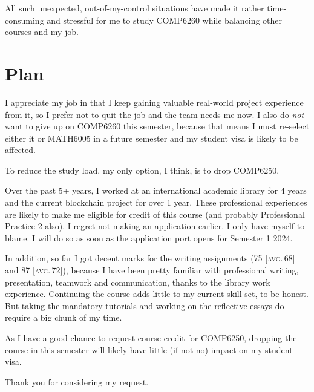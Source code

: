 \documentclass[12pt,a4paper]{article}
\begin{document}
All such unexpected, out-of-my-control situations have made it rather time-consuming and stressful for me to study COMP6260 while balancing other courses and my job.


\section{Plan}
I appreciate my job in that I keep gaining valuable real-world project experience from it, so I prefer not to quit the job and the team needs me now.  I also do \emph{not} want to give up on COMP6260 this semester, because that means I must re-select either it or MATH6005 in a future semester and my student visa is likely to be affected.

To reduce the study load, my only option, I think, is to drop COMP6250.

Over the past 5+ years, I worked at an international academic library for 4 years and the current blockchain project for over 1 year.  These professional experiences are likely to make me eligible for credit of this course (and probably Professional Practice 2 also).  I regret not making an application earlier.  I only have myself to blame.  I will do so as soon as the application port opens for Semester 1 2024.

In addition, so far I got decent marks for the writing assignments (75 [\textsc{avg.}\,68] and 87 [\textsc{avg.}\,72]), because I have been pretty familiar with professional writing, presentation, teamwork and communication, thanks to the library work experience.  Continuing the course adds little to my current skill set, to be honest. But taking the mandatory tutorials and working on the reflective essays do require a big chunk of my time.

As I have a good chance to request course credit for COMP6250, dropping the course in this semester will likely have little (if not no) impact on my student visa.


Thank you for considering my request.
\end{document}
